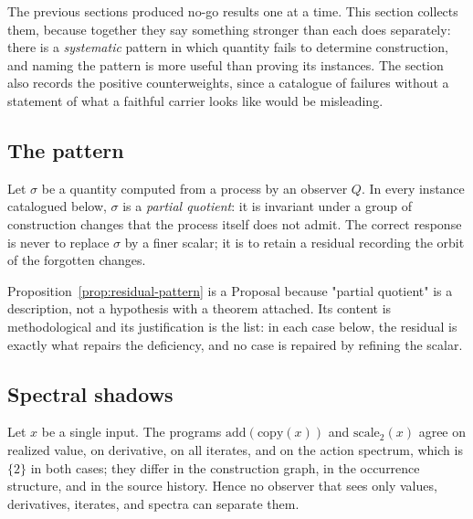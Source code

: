 \label{sec:residual-body}

The previous sections produced no-go results one at a time.  This section collects them,
because together they say something stronger than each does separately: there is a
\emph{systematic} pattern in which quantity fails to determine construction, and naming
the pattern is more useful than proving its instances.  The section also records the
positive counterweights, since a catalogue of failures without a statement of what a
faithful carrier looks like would be misleading.

\subsection{The pattern}

\begin{proposal}\label{prop:residual-pattern}
Let $\sigma$ be a quantity computed from a process by an observer $Q$.  In every
instance catalogued below, $\sigma$ is a \emph{partial quotient}: it is invariant under a
group of construction changes that the process itself does not admit.  The correct
response is never to replace $\sigma$ by a finer scalar; it is to retain a residual
recording the orbit of the forgotten changes.
\end{proposal}

\begin{remark}
Proposition~\ref{prop:residual-pattern} is a \textsf{Proposal} because "partial quotient"
is a description, not a hypothesis with a theorem attached.  Its content is
methodological and its justification is the list: in each case below, the residual is
exactly what repairs the deficiency, and no case is repaired by refining the scalar.
\end{remark}

\subsection{Spectral shadows}

\begin{theorem}\label{thm:spectrum-history}
Let $x$ be a single input.  The programs $\mathrm{add}(\mathrm{copy}(x))$ and
$\mathrm{scale}_{2}(x)$ agree on realized value, on derivative, on all iterates, and on
the action spectrum, which is $\{2\}$ in both cases; they differ in the construction
graph, in the occurrence structure, and in the source history.  Hence no observer that
sees only values, derivatives, iterates, and spectra can separate them.
\end{theorem}

